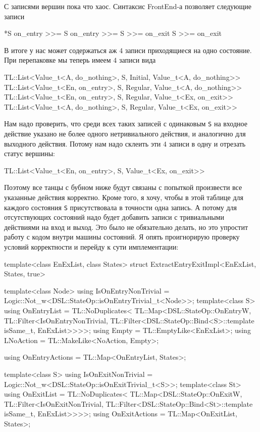 \documentclass{article}
\begin{document}
{С записями вершин пока что хаос.
Синтаксис FrontEnd-а позволяет следующие записи
\begin{cppcode}
*S
on_entry >>= S
on_entry >>= S >>= on_exit
S >>= on_exit
\end{cppcode}
В итоге у нас может содержаться аж $4$ записи приходящиеся на одно состояние.
При перепаковке мы теперь имеем $4$ записи вида
\begin{cppcode}
TL::List<Value_t<A,  do_nothing>, S, Initial, Value_t<A,  do_nothing>>
TL::List<Value_t<En, on_entry>,   S, Regular, Value_t<A,  do_nothing>>
TL::List<Value_t<En, on_entry>,   S, Regular, Value_t<Ex, on_exit>>
TL::List<Value_t<A,  do_nothing>, S, Regular, Value_t<Ex, on_exit>>
\end{cppcode}
Нам надо проверить, что среди всех таких записей с одинаковым \verb"S" на входное действие указано не более одного нетривиального действия, и аналогично для выходного действия.
Потому нам надо склеить эти $4$ записи в одну и отрезать статус вершины:
\begin{cppcode}
TL::List<Value_t<En, on_entry>, S, Value_t<Ex, on_exit>>
\end{cppcode}
Поэтому все танцы с бубном ниже будут связаны с попыткой произвести все указанные действия корректно.
Кроме того, я хочу, чтобы в этой таблице для каждого состояния \verb"S" присутствовала в точности одна запись.
А потому для отсутствующих состояний надо будет добавить записи с тривиальными действиями на вход и выход.
Это было не обязательно делать, но это упростит работу с кодом внутри машины состояний.
Я опять проигнорирую проверку условий корректности и перейду к сути имплементации:
\begin{cppcode}
template<class EnExList, class States>
struct ExtractEntryExitImpl<EnExList, States, true> {
  template<class Node>
  using IsOnEntryNonTrivial =
      Logic::Not_w<DSL::StateOp::isOnEntryTrivial_t<Node>>;
  template<class S>
  using OnEntryList = TL::NoDuplicates<
      TL::Map<DSL::StateOp::OnEntryW,
              TL::Filter<IsOnEntryNonTrivial,
                         TL::Filter<DSL::StateOp::Bind<S>::template isSame_t,
                                    EnExList>>>>;
  using Empty = TL::EmptyLike<EnExList>;
  using LNoAction = TL::MakeLike<NoAction, Empty>;

  using OnEntryActions = TL::Map<OnEntryList, States>;

  template<class S>
  using IsOnExitNonTrivial = Logic::Not_w<DSL::StateOp::isOnExitTrivial_t<S>>;
  template<class St>
  using OnExitList = TL::NoDuplicates<
      TL::Map<DSL::StateOp::OnExitW,
              TL::Filter<IsOnExitNonTrivial,
                         TL::Filter<DSL::StateOp::Bind<St>::template isSame_t,
                                    EnExList>>>>;
  using OnExitActions = TL::Map<OnExitList, States>;

}
\end{cppcode}}
\end{document}
